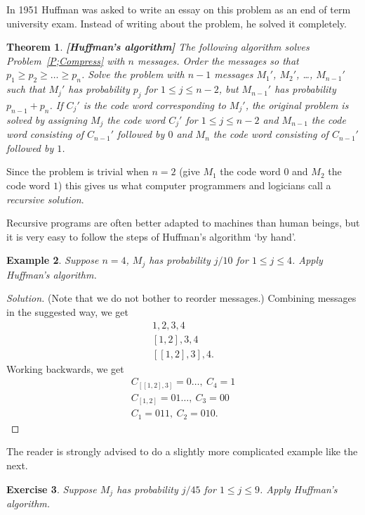 \documentclass[12pt,a4paper]{article}
\theoremstyle{plain}
\newtheorem{theorem}{Theorem}[section]
\newtheorem{example}[theorem]{Example}
\newtheorem{exercise}[theorem]{Exercise}
\theoremstyle{definition}
\begin{document}
In 1951 Huffman was asked to write an essay on this problem
as an end of term university exam. Instead of writing about the problem,
he solved it completely.
\begin{theorem}\label{T;Huffman}{\bf [Huffman's algorithm]} 
The following algorithm
solves Problem~\ref{P;Compress} with $n$ messages.
Order the messages so that $p_{1}\geq p_{2}\geq \dots\geq p_{n}$.
Solve the problem with $n-1$ messages $M_{1}'$, $M_{2}'$,
\dots, $M_{n-1}'$ such that $M_{j}'$ has probability $p_{j}$
for $1\leq j\leq n-2$, but $M_{n-1}'$ has probability
$p_{n-1}+p_{n}$. If $C_{j}'$ is the code word corresponding
to $M_{j}'$, the original problem is solved by assigning $M_{j}$
the code word $C_{j}'$ for $1\leq j\leq n-2$ and
$M_{n-1}$ the code word consisting of $C_{n-1}'$ followed
by $0$ and $M_{n}$ the code word consisting of $C_{n-1}'$ 
followed by $1$.
\end{theorem}
Since the problem is trivial when $n=2$ (give $M_{1}$ the code word $0$
and $M_{2}$ the code word $1$) this gives us what computer programmers
and logicians call a \emph{recursive solution}.

Recursive programs are often 
better adapted to machines 
than human beings, but it is very easy
to follow the steps of Huffman's algorithm `by hand'.

\begin{example}\label{E;Huffman do} 
Suppose $n=4$, $M_{j}$ has probability $j/10$ 
for $1\leq j\leq 4$. Apply Huffman's algorithm.
\end{example}
\begin{proof}[Solution]
(Note that we do not bother to reorder messages.)
Combining messages in the suggested way, we get
\begin{gather*}
1,2,3,4\\
[1,2],3,4\\
[[1,2],3],4.
\end{gather*}
Working backwards, we get
\begin{gather*}
C_{[[1,2],3]}=0\ldots,\ C_{4}=1\\
C_{[1,2]}=01\dots,\ C_{3}=00\\
C_{1}=011,\ C_{2}=010.
\end{gather*}
\end{proof}
The reader is strongly advised to do a slightly more
complicated example like the next.
\begin{exercise}\label{E;Huffman 1} 
Suppose $M_{j}$ has probability $j/45$ 
for $1\leq j\leq 9$. Apply Huffman's algorithm.
\end{exercise}
\end{document}
